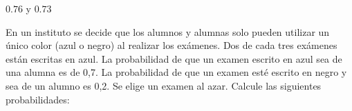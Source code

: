 \documentclass[addpoints,spanish, 12pt,a4paper]{exam}
\begin{document}
\begin{questions}
\begin{solution}
$0.76$ y $0.73$  
\end{solution}


\question En un instituto se decide que los alumnos y alumnas solo pueden utilizar un único color (azul o negro) al realizar los exámenes. Dos de cada tres exámenes están escritas en azul. La probabilidad de que un examen escrito en azul sea de una alumna es de 0,7. La probabilidad de que un examen esté escrito en negro y sea de un alumno es 0,2. Se elige un examen al azar. Calcule las siguientes probabilidades:
\end{questions}
\end{document}
